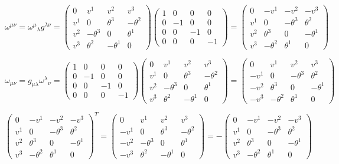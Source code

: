 \documentclass{article}
\begin{document}
\[\omega^{\mu\nu}={\omega^\mu}_\lambda g^{\lambda\nu}=\begin{pmatrix}0&v^1&v^2&v^3\\v^1&0&\theta^3&-\theta^2\\v^2&-\theta^3&0&\theta^1\\v^3&\theta^2&-\theta^1&0\end{pmatrix}
	\begin{pmatrix}1&0&0&0\\0&-1&0&0\\0&0&-1&0\\0&0&0&-1\end{pmatrix}=
	\begin{pmatrix}0&-v^1&-v^2&-v^3\\v^1&0&-\theta^3&\theta^2\\v^2&\theta^3&0&-\theta^1\\v^3&-\theta^2&\theta^1&0\end{pmatrix}\]

\[\omega_{\mu\nu}=g_{\mu\lambda}{\omega^\lambda}_\nu =\begin{pmatrix}1&0&0&0\\0&-1&0&0\\0&0&-1&0\\0&0&0&-1\end{pmatrix}
	\begin{pmatrix}0&v^1&v^2&v^3\\v^1&0&\theta^3&-\theta^2\\v^2&-\theta^3&0&\theta^1\\v^3&\theta^2&-\theta^1&0\end{pmatrix}=
	\begin{pmatrix}0&v^1&v^2&v^3\\-v^1&0&-\theta^3&\theta^2\\-v^2&\theta^3&0&-\theta^1\\-v^3&-\theta^2&\theta^1&0\end{pmatrix}\]

\[\begin{pmatrix}0&-v^1&-v^2&-v^3\\v^1&0&-\theta^3&\theta^2\\v^2&\theta^3&0&-\theta^1\\v^3&-\theta^2&\theta^1&0\end{pmatrix}^T=\begin{pmatrix}0&v^1&v^2&v^3\\-v^1&0&\theta^3&-\theta^2\\-v^2&-\theta^3&0&\theta^1\\-v^3&\theta^2&-\theta^1&0\end{pmatrix}=-\begin{pmatrix}0&-v^1&-v^2&-v^3\\v^1&0&-\theta^3&\theta^2\\v^2&\theta^3&0&-\theta^1\\v^3&-\theta^2&\theta^1&0\end{pmatrix}\]
\end{document}
